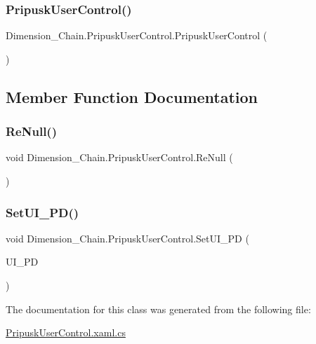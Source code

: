 \subsubsection{\texorpdfstring{Pripusk\+User\+Control()}{PripuskUserControl()}}
{\footnotesize\ttfamily Dimension\+\_\+\+Chain.\+Pripusk\+User\+Control.\+Pripusk\+User\+Control (\begin{DoxyParamCaption}{ }\end{DoxyParamCaption})}



\subsection{Member Function Documentation}
\mbox{\label{class_dimension___chain_1_1_pripusk_user_control_a15805f1227585bd517f428f0c773d803}} 
\subsubsection{\texorpdfstring{Re\+Null()}{ReNull()}}
{\footnotesize\ttfamily void Dimension\+\_\+\+Chain.\+Pripusk\+User\+Control.\+Re\+Null (\begin{DoxyParamCaption}{ }\end{DoxyParamCaption})}

\mbox{\label{class_dimension___chain_1_1_pripusk_user_control_a4907b2646788dd49f089d3e1e2fd6af4}} 
\subsubsection{\texorpdfstring{Set\+U\+I\+\_\+\+P\+D()}{SetUI\_PD()}}
{\footnotesize\ttfamily void Dimension\+\_\+\+Chain.\+Pripusk\+User\+Control.\+Set\+U\+I\+\_\+\+PD (\begin{DoxyParamCaption}\item[{\mbox{\hyperlink{class_dimension___chain_1_1_u_i___pripusk_dimension}{U\+I\+\_\+\+Pripusk\+Dimension}}}]{U\+I\+\_\+\+PD }\end{DoxyParamCaption})}



The documentation for this class was generated from the following file\+:\begin{DoxyCompactItemize}
\item 
\mbox{\hyperlink{_pripusk_user_control_8xaml_8cs}{Pripusk\+User\+Control.\+xaml.\+cs}}\end{DoxyCompactItemize}
